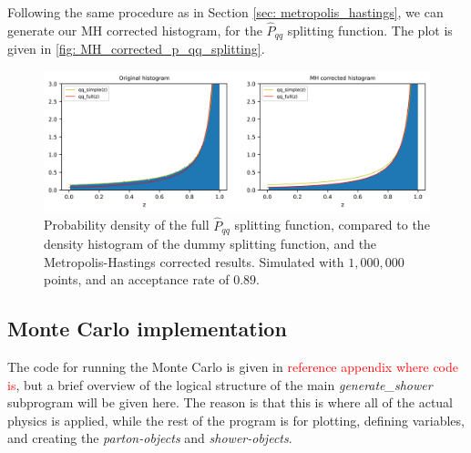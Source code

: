 \documentclass[main.tex]{subfiles}
\begin{document}
Following the same procedure as in Section \ref{sec: metropolis_hastings}, we can generate our MH corrected histogram, for the \(\hat{P}_{qq}\) splitting function. The plot is given in \autoref{fig: MH_corrected_p_qq_splitting}.
\begin{figure}[ht]
    \centering
    \includegraphics[width=14cm]{pictures/MH_plots/MH_vacuum_qq.png}
    \caption{Probability density of the full \(\hat{P}_{qq}\) splitting function, compared to the density histogram of the dummy splitting function, and the Metropolis-Hastings corrected results. Simulated with \(1,000,000\) points, and an acceptance rate of \(0.89\).}
    \label{fig: MH_corrected_p_qq_splitting}
\end{figure}

\subsection{Monte Carlo implementation}
The  code for running the Monte Carlo is given in \textcolor{red}{reference appendix where code is}, but a brief overview of the logical structure of the main \textit{generate\_shower} subprogram will be given here. The reason is that this is where all of the actual physics is applied, while the rest of the program is for plotting, defining variables, and creating the \textit{parton-objects} and \textit{shower-objects}. 
\end{document}
